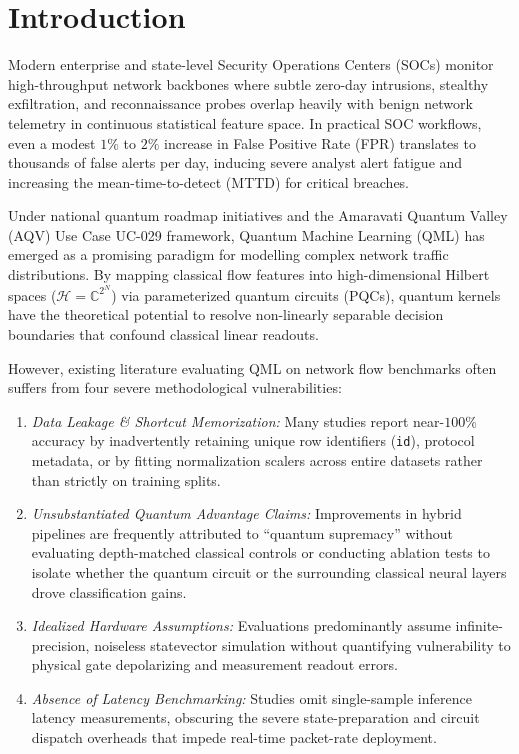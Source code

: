 \documentclass[conference]{IEEEtran}
\begin{document}
\section{Introduction}
Modern enterprise and state-level Security Operations Centers (SOCs) monitor high-throughput network backbones where subtle zero-day intrusions, stealthy exfiltration, and reconnaissance probes overlap heavily with benign network telemetry in continuous statistical feature space. In practical SOC workflows, even a modest $1\%$ to $2\%$ increase in False Positive Rate (FPR) translates to thousands of false alerts per day, inducing severe analyst alert fatigue and increasing the mean-time-to-detect (MTTD) for critical breaches.

Under national quantum roadmap initiatives and the Amaravati Quantum Valley (AQV) Use Case UC-029 framework, Quantum Machine Learning (QML) has emerged as a promising paradigm for modelling complex network traffic distributions. By mapping classical flow features into high-dimensional Hilbert spaces ($\mathcal{H} = \mathbb{C}^{2^N}$) via parameterized quantum circuits (PQCs), quantum kernels have the theoretical potential to resolve non-linearly separable decision boundaries that confound classical linear readouts.

However, existing literature evaluating QML on network flow benchmarks often suffers from four severe methodological vulnerabilities:
\begin{enumerate}
    \item \textit{Data Leakage \& Shortcut Memorization:} Many studies report near-$100\%$ accuracy by inadvertently retaining unique row identifiers (\texttt{id}), protocol metadata, or by fitting normalization scalers across entire datasets rather than strictly on training splits.
    \item \textit{Unsubstantiated Quantum Advantage Claims:} Improvements in hybrid pipelines are frequently attributed to ``quantum supremacy'' without evaluating depth-matched classical controls or conducting ablation tests to isolate whether the quantum circuit or the surrounding classical neural layers drove classification gains.
    \item \textit{Idealized Hardware Assumptions:} Evaluations predominantly assume infinite-precision, noiseless statevector simulation without quantifying vulnerability to physical gate depolarizing and measurement readout errors.
    \item \textit{Absence of Latency Benchmarking:} Studies omit single-sample inference latency measurements, obscuring the severe state-preparation and circuit dispatch overheads that impede real-time packet-rate deployment.
\end{enumerate}
\end{document}
